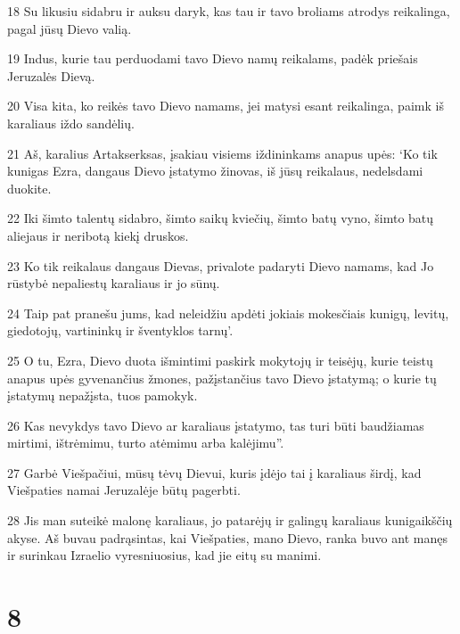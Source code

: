 \par 18 Su likusiu sidabru ir auksu daryk, kas tau ir tavo broliams atrodys reikalinga, pagal jūsų Dievo valią. 
\par 19 Indus, kurie tau perduodami tavo Dievo namų reikalams, padėk priešais Jeruzalės Dievą. 
\par 20 Visa kita, ko reikės tavo Dievo namams, jei matysi esant reikalinga, paimk iš karaliaus iždo sandėlių. 
\par 21 Aš, karalius Artakserksas, įsakiau visiems iždininkams anapus upės: ‘Ko tik kunigas Ezra, dangaus Dievo įstatymo žinovas, iš jūsų reikalaus, nedelsdami duokite. 
\par 22 Iki šimto talentų sidabro, šimto saikų kviečių, šimto batų vyno, šimto batų aliejaus ir neribotą kiekį druskos. 
\par 23 Ko tik reikalaus dangaus Dievas, privalote padaryti Dievo namams, kad Jo rūstybė nepaliestų karaliaus ir jo sūnų. 
\par 24 Taip pat pranešu jums, kad neleidžiu apdėti jokiais mokesčiais kunigų, levitų, giedotojų, vartininkų ir šventyklos tarnų’. 
\par 25 O tu, Ezra, Dievo duota išmintimi paskirk mokytojų ir teisėjų, kurie teistų anapus upės gyvenančius žmones, pažįstančius tavo Dievo įstatymą; o kurie tų įstatymų nepažįsta, tuos pamokyk. 
\par 26 Kas nevykdys tavo Dievo ar karaliaus įstatymo, tas turi būti baudžiamas mirtimi, ištrėmimu, turto atėmimu arba kalėjimu”. 
\par 27 Garbė Viešpačiui, mūsų tėvų Dievui, kuris įdėjo tai į karaliaus širdį, kad Viešpaties namai Jeruzalėje būtų pagerbti. 
\par 28 Jis man suteikė malonę karaliaus, jo patarėjų ir galingų karaliaus kunigaikščių akyse. Aš buvau padrąsintas, kai Viešpaties, mano Dievo, ranka buvo ant manęs ir surinkau Izraelio vyresniuosius, kad jie eitų su manimi.



\chapter{8}


